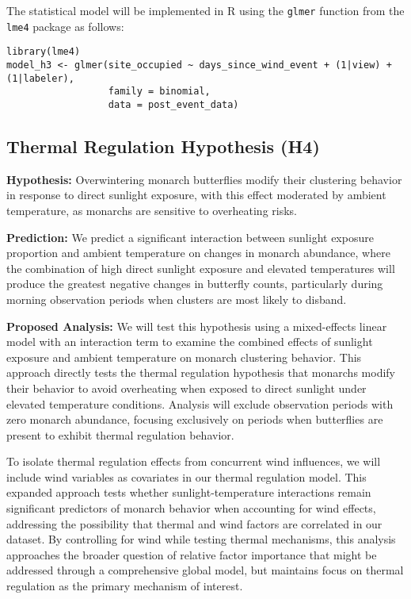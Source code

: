The statistical model will be implemented in R using the \texttt{glmer} function from the \texttt{lme4} package as follows:

\begin{verbatim}
library(lme4)
model_h3 <- glmer(site_occupied ~ days_since_wind_event + (1|view) + (1|labeler),
                  family = binomial,
                  data = post_event_data)
\end{verbatim}

\subsection{Thermal Regulation Hypothesis (H4)}

\textbf{Hypothesis:} Overwintering monarch butterflies modify their clustering behavior in response to direct sunlight exposure, with this effect moderated by ambient temperature, as monarchs are sensitive to overheating risks.

\textbf{Prediction:} We predict a significant interaction between sunlight exposure proportion and ambient temperature on changes in monarch abundance, where the combination of high direct sunlight exposure and elevated temperatures will produce the greatest negative changes in butterfly counts, particularly during morning observation periods when clusters are most likely to disband.

\textbf{Proposed Analysis:}
We will test this hypothesis using a mixed-effects linear model with an interaction term to examine the combined effects of sunlight exposure and ambient temperature on monarch clustering behavior. This approach directly tests the thermal regulation hypothesis that monarchs modify their behavior to avoid overheating when exposed to direct sunlight under elevated temperature conditions. Analysis will exclude observation periods with zero monarch abundance, focusing exclusively on periods when butterflies are present to exhibit thermal regulation behavior.

To isolate thermal regulation effects from concurrent wind influences, we will include wind variables as covariates in our thermal regulation model. This expanded approach tests whether sunlight-temperature interactions remain significant predictors of monarch behavior when accounting for wind effects, addressing the possibility that thermal and wind factors are correlated in our dataset. By controlling for wind while testing thermal mechanisms, this analysis approaches the broader question of relative factor importance that might be addressed through a comprehensive global model, but maintains focus on thermal regulation as the primary mechanism of interest.

